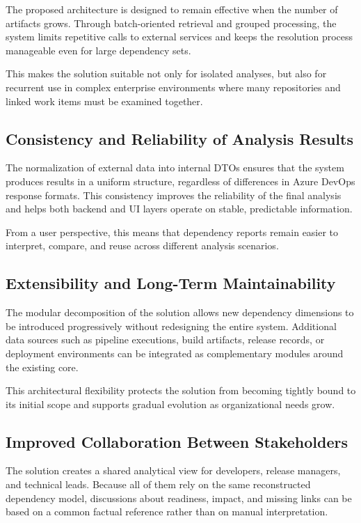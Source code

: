 The proposed architecture is designed to remain effective when the number of
artifacts grows. Through batch-oriented retrieval and grouped processing, the
system limits repetitive calls to external services and keeps the resolution
process manageable even for large dependency sets.

This makes the solution suitable not only for isolated analyses, but also for
recurrent use in complex enterprise environments where many repositories and
linked work items must be examined together.

\subsection{Consistency and Reliability of Analysis Results}

The normalization of external data into internal DTOs ensures that the system
produces results in a uniform structure, regardless of differences in Azure
DevOps response formats. This consistency improves the reliability of the final
analysis and helps both backend and UI layers operate on stable, predictable
information.

From a user perspective, this means that dependency reports remain easier to
interpret, compare, and reuse across different analysis scenarios.

\subsection{Extensibility and Long-Term Maintainability}

The modular decomposition of the solution allows new dependency dimensions to be
introduced progressively without redesigning the entire system. Additional data
sources such as pipeline executions, build artifacts, release records, or
deployment environments can be integrated as complementary modules around the
existing core.

This architectural flexibility protects the solution from becoming tightly bound
to its initial scope and supports gradual evolution as organizational needs grow.

\subsection{Improved Collaboration Between Stakeholders}

The solution creates a shared analytical view for developers, release managers,
and technical leads. Because all of them rely on the same reconstructed
dependency model, discussions about readiness, impact, and missing links can be
based on a common factual reference rather than on manual interpretation.

